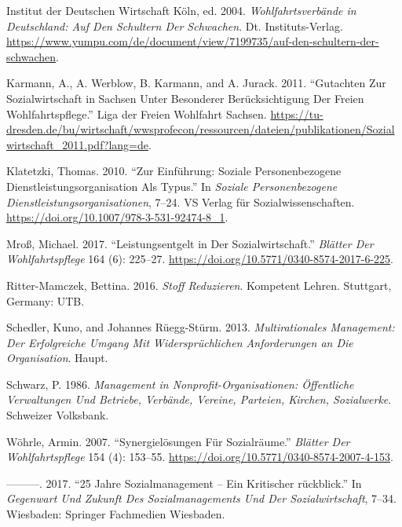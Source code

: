 \documentclass[
  letterpaper,
]{book}
\newlength{\cslhangindent}
\newenvironment{CSLReferences}[2] %
 {\begin{list}{}{%
  \setlength{\itemindent}{0pt}
  \setlength{\leftmargin}{0pt}
  \setlength{\parsep}{0pt}
  \ifodd #1
   \setlength{\leftmargin}{\cslhangindent}
   \setlength{\itemindent}{-1\cslhangindent}
  \fi
  \setlength{\itemsep}{#2\baselineskip}}}
 {\end{list}}
\begin{document}
\begin{CSLReferences}{1}{0}
Institut der Deutschen Wirtschaft Köln, ed. 2004.
\emph{Wohlfahrtsverbände in Deutschland: Auf Den Schultern Der
Schwachen}. Dt. Instituts-Verlag.
\url{https://www.yumpu.com/de/document/view/7199735/auf-den-schultern-der-schwachen}.

Karmann, A., A. Werblow, B. Karmann, and A. Jurack. 2011. {``Gutachten
Zur Sozialwirtschaft in Sachsen Unter Besonderer Berücksichtigung Der
Freien Wohlfahrtspflege.''} Liga der Freien Wohlfahrt Sachsen.
\url{https://tu-dresden.de/bu/wirtschaft/wwsprofecon/ressourcen/dateien/publikationen/Sozialwirtschaft_2011.pdf?lang=de}.

Klatetzki, Thomas. 2010. {``Zur Einführung: Soziale Personenbezogene
Dienstleistungsorganisation Als Typus.''} In \emph{Soziale
Personenbezogene Dienstleistungsorganisationen}, 7--24. VS Verlag für
Sozialwissenschaften. \url{https://doi.org/10.1007/978-3-531-92474-8_1}.

Mroß, Michael. 2017. {``Leistungsentgelt in Der Sozialwirtschaft.''}
\emph{Blätter Der Wohlfahrtspflege} 164 (6): 225--27.
\url{https://doi.org/10.5771/0340-8574-2017-6-225}.

Ritter-Mamczek, Bettina. 2016. \emph{Stoff Reduzieren}. Kompetent
Lehren. Stuttgart, Germany: UTB.

Schedler, Kuno, and Johannes Rüegg-Stürm. 2013. \emph{Multirationales
Management: Der Erfolgreiche Umgang Mit Widerspr{ü}chlichen
Anforderungen an Die Organisation}. Haupt.

Schwarz, P. 1986. \emph{Management in Nonprofit-Organisationen:
{Ö}ffentliche Verwaltungen Und Betriebe, Verb{ä}nde, Vereine, Parteien,
Kirchen, Sozialwerke}. Schweizer Volksbank.

Wöhrle, Armin. 2007. {``Synergielösungen Für Sozialräume.''}
\emph{Blätter Der Wohlfahrtspflege} 154 (4): 153--55.
\url{https://doi.org/10.5771/0340-8574-2007-4-153}.

---------. 2017. {``25 Jahre Sozialmanagement -- Ein Kritischer
r{ü}ckblick.''} In \emph{Gegenwart Und Zukunft Des Sozialmanagements Und
Der Sozialwirtschaft}, 7--34. Wiesbaden: Springer Fachmedien Wiesbaden.

\end{CSLReferences}


\backmatter
\end{document}
